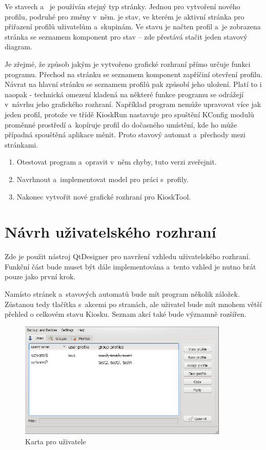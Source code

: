 Ve stavech  a~ je používán stejný typ stránky. Jednou pro vytvoření nového profilu, podruhé pro změny v~něm.\linebreak {} je stav, ve kterém je aktivní stránka pro přiřazení profilů uživatelům a~skupinám. Ve stavu  je načten profil a~je zobrazena stránka se seznamem komponent pro stav  -- zde přestává stačit jeden stavový diagram.

Je zřejmé, že způsob jakým je vytvořeno grafické rozhraní přímo určuje funkci programu. Přechod na stránku se seznamem komponent zapříčiní otevření profilu. Návrat na hlavní stránku se seznamem profilů pak způsobí jeho uložení. Platí to i naopak - technická omezení kladená na některé funkce programu se odrážejí v~návrhu jeho grafického rozhraní. Například program nemůže upravovat více jak jeden profil, protože ve třídě KioskRun nastavuje pro spuštění KConfig modulů proměnné prostředí a~kopíruje profil do dočasného umístění, kde ho může případná spouštěná aplikace měnit. Proto stavový automat a~přechody mezi stránkami.

\begin{enumerate}
\item Otestovat program a~opravit v~něm chyby, tuto verzi zveřejnit.
\item Navrhnout a~implementovat model pro práci s~profily.
\item Nakonec vytvořit nové grafické rozhraní pro KioskTool.
\end{enumerate}

\section{Návrh uživatelského rozhraní}
Zde je použit nástroj QtDesigner pro navržení vzhledu uživatelského rozhraní. Funkční část bude muset být dále implementována a~tento vzhled je nutno brát pouze jako první krok.

Namísto stránek a~stavových automatů bude mít program několik záložek. Zůstanou tedy tlačítka s~akcemi po stranách, ale uživatel bude mít mnohem větší přehled o celkovém stavu Kiosku. Seznam akcí také bude významně rozšířen.

\begin{figure}
\centering
\includegraphics[width=10cm]{obrazky/navrh-usersz.png}
\caption{Karta pro uživatele}
\label{fig:kt4_newusers}
\end{figure}

